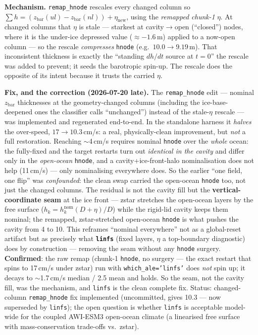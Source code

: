\documentclass[11pt,a4paper]{article}
\newcommand{\code}[1]{\texttt{\small #1}}
\begin{document}
\textbf{Mechanism.} \code{remap\_hnode} rescales every changed column so
$\sum h = (z_{\mathrm{bar}}(ul)-z_{\mathrm{bar}}(nl)) + \eta_{\mathrm{new}}$, using the
\emph{remapped chunk-1} $\eta$. At changed columns that $\eta$ is stale --- starkest at
cavity$\to$open (``closed'') nodes, where it is the under-ice depressed value
($\approx-1.6$\,m) applied to a now-open column --- so the rescale \emph{compresses}
\code{hnode} (e.g.\ $10.0\to9.19$\,m). That inconsistent thickness is exactly the ``standing
$dh/dt$ source at $t{=}0$'' the rescale was added to prevent; it seeds the barotropic
spin-up. The rescale does the opposite of its intent because it trusts the carried $\eta$.

\textbf{Fix, and the correction (2026-07-20 late).} The \code{remap\_hnode} edit --- nominal
$z_{\mathrm{bar}}$ thicknesses at the geometry-changed columns (including the ice-base-deepened
ones the classifier calls ``unchanged'') instead of the stale-$\eta$ rescale --- was
implemented and regenerated end-to-end. In the standalone harness it \emph{halves} the
over-speed, $17\to10.3$\,cm/s: a real, physically-clean improvement, but \emph{not} a full
restoration. Reaching $\sim$4\,cm/s requires nominal \code{hnode} over the \emph{whole} ocean:
the fully-fixed and the target restarts turn out \emph{identical in the cavity} and differ only
in the \emph{open-ocean} \code{hnode}, and a cavity+ice-front-halo nominalisation does not help
(11\,cm/s) --- only nominalising everywhere does. So the earlier ``one field, one flip'' was
\emph{confounded}: the clean swap carried the open-ocean \code{hnode} too, not just the changed
columns. The residual is not the cavity fill but the \textbf{vertical-coordinate seam} at the
ice front --- zstar stretches the open-ocean layers by the free surface
($h_k = h_k^{\mathrm{nom}}(D+\eta)/D$) while the rigid-lid cavity keeps them nominal; the
remapped, zstar-stretched open-ocean \code{hnode} is what pushes the cavity from 4 to 10. This
reframes ``nominal everywhere'' not as a global-reset artifact but as precisely what
\textbf{\code{linfs}} (fixed layers, $\eta$ a top-boundary diagnostic) does by construction ---
removing the seam without any \code{hnode} surgery. \textbf{Confirmed}: the raw remap
(chunk-1 \code{hnode}, no surgery --- the exact restart that spins to 17\,cm/s under zstar) run
with \code{which\_ale='linfs'} does \emph{not} spin up; it decays to $\sim$1.7\,cm/s median /
2.5 mean and holds. So the seam, not the cavity fill, was the mechanism, and \code{linfs} is
the clean complete fix. Status: changed-column \code{remap\_hnode} fix implemented
(uncommitted, gives 10.3 --- now superseded by \code{linfs}); the open question is whether
\code{linfs} is acceptable model-wide for the coupled AWI-ESM3 open-ocean climate (a
linearised free surface with mass-conservation trade-offs vs.\ zstar).
\end{document}

